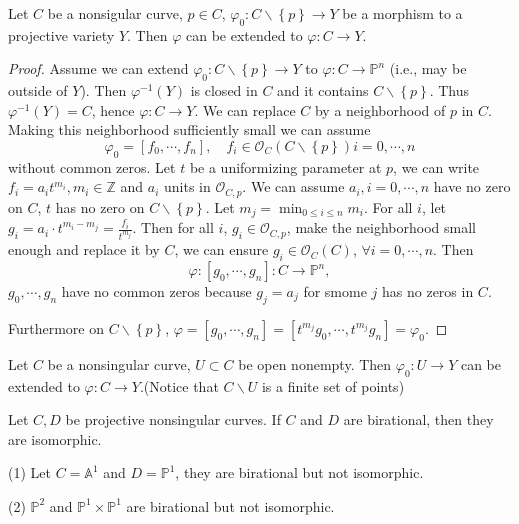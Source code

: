 \begin{theorem}
   Let $C$ be a nonsigular curve, $p \in  C$,  $\varphi_0:C \backslash \left\{p\right\} \to Y$ be a morphism to a projective variety $Y$. Then $\varphi$ can be extended to $\varphi:C\to Y$.
\end{theorem}
\begin{proof}
  Assume we can extend  $\varphi_0:C\backslash \left\{p\right\} \to Y$ to  $\varphi:C\to \mathbb{P}^{n}$ (i.e., may be outside of $Y$). Then $\varphi^{-1}(Y)$ is closed in $C$ and it contains $C\backslash \left\{p\right\} $. Thus $\varphi^{-1}(Y)=C$, hence $\varphi:C\to Y$. We can replace $C$ by a neighborhood of $p$ in $C$. Making this neighborhood sufficiently small we can assume 
  \[
    \varphi_0=[f_0,\cdots ,f_n],\quad f_i \in \mathcal{O}_{C}\left( C\backslash \left\{p\right\}  \right) i=0,\cdots ,n
  \] 
  without common zeros. Let $t$ be a uniformizing parameter at $p$, we can write $f_i=a_it ^{m_i},m_i \in \mathbb{Z}$ and $a_i$ units in $\mathcal{O}_{C,p}$. We can assume $a_i,i=0,\cdots ,n$ have no zero on $C$, $t$ has no zero on $C\backslash \left\{p\right\} $. Let $m_j=\min_{0\le i \le n}m_i$. For all $i$, let $g_i=a_i\cdot t ^{m_i-m_j}=\frac{f_i}{t ^{m_j}}$. Then for all $i$, $g_i \in \mathcal{O}_{C,p}$, make  the neighborhood small enough and replace it by $C$, we can ensure $g_i \in \mathcal{O}_{C}(C)$, $\forall i=0,\cdots ,n$. Then 
  \[
  \varphi:\left[ g_0,\cdots ,g_n \right] :C\to \mathbb{P}^{n},
  \] 
  $g_0,\cdots ,g_n$ have no common zeros because $g_j=a_j$ for smome $j$ has no zeros in $C$.

  Furthermore on $C\backslash \left\{p\right\} $, $\varphi=\left[ g_0,\cdots ,g_n \right] =[t ^{m_j}g_0,\cdots , t ^{m_j}g_n]=\varphi_0$.
\end{proof}

\begin{corollary}
  Let $C$ be a nonsingular curve, $U\subset C$ be open nonempty. Then $\varphi_0:U\to Y$ can be extended to $\varphi:C\to Y$.(Notice that $C\backslash U$ is a finite set of points)
\end{corollary}

\begin{corollary}
  Let $C,D$ be projective nonsingular curves. If $C$ and $D$ are birational, then they are isomorphic.
\end{corollary}

 \begin{remark}
   (1) Let $C=\mathbb{A}^{1}$ and $D=\mathbb{P}^{1}$, they are birational but not isomorphic.

   (2)  $\mathbb{P}^{2}$ and $\mathbb{P}^{1}\times \mathbb{P}^{1}$ are birational but not isomorphic.
\end{remark}

